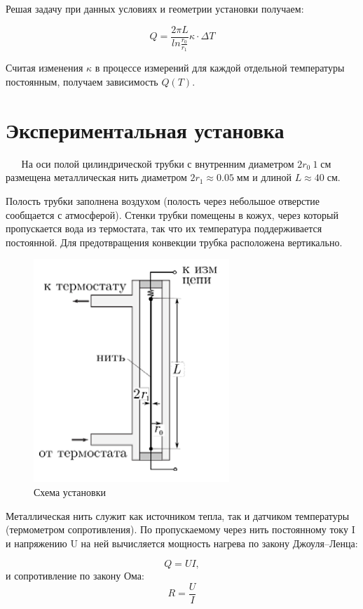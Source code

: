 \documentclass[12pt,a4paper]{article}
\begin{document}
	Решая задачу при данных условиях и геометрии установки получаем:
	
	\begin{equation}
		Q = \frac{2\pi L}{ln\frac{r_0}{r_1}} \kappa \cdot \Delta T
	\end{equation}

	Считая изменения $\kappa$ в процессе измерений для каждой отдельной температуры постоянным, получаем зависимость $Q(T)$.
	

	\section*{Экспериментальная установка}
	
	$\quad \;$  На оси полой цилиндрической трубки с внутренним диаметром $2r_0 ~ 1 \; \text{см}$ размещена металлическая нить диаметром $2r_1 \approx 0.05 \; \text{мм}$ и длиной 
	$L \approx 40 \; \text{см}$.
	
	Полость трубки заполнена воздухом (полость через небольшое отверстие сообщается с атмосферой).
	Стенки трубки помещены в кожух, через который пропускается вода из термостата, так что их температура поддерживается постоянной.
	Для предотвращения конвекции трубка расположена вертикально.
	
	\begin{figure}[h]
		\begin{center}
			\includegraphics[width=0.3\linewidth]{scheme.png}
		\end{center}
		\caption{Схема установки}
		\label{scheme}
	\end{figure}	
	
	Металлическая нить служит как источником тепла, так и датчиком температуры (термометром сопротивления). По пропускаемому через нить постоянному току I и напряжению U на ней вычисляется мощность нагрева по закону Джоуля–Ленца:
	
	\begin{equation*}
		Q = UI,
	\end{equation*}
	и сопротивление по закону Ома:
	\begin{equation*}
		R = \frac{U}{I}
	\end{equation*}
	
\end{document}
